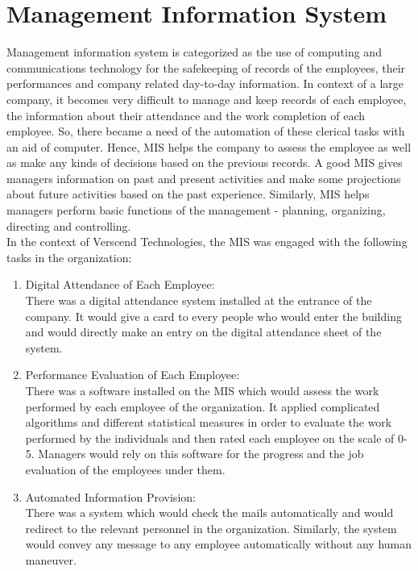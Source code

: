 \section{Management Information System}
Management information system is categorized as the use of computing and communications technology for
the safekeeping of records of the employees, their performances and company related day-to-day information.
In context of a large company, it becomes very difficult to manage and keep records of each employee, the
information about their attendance and the work completion of each employee. So, there became a need of
the automation of these clerical tasks with an aid of computer. Hence, MIS helps the company to assess the
employee as well as make any kinds of decisions based on the previous records. A good MIS gives managers
information on past and present activities and make some projections about future activities based on the past
experience. Similarly, MIS helps managers perform basic functions of the management - planning, organizing,
directing and controlling.\\
In the context of Verscend Technologies, the MIS was engaged with the following tasks in the
organization:
\begin{enumerate}
\item Digital Attendance of Each Employee: \\There was a digital attendance system installed at the entrance of
the company. It would give a card to every people who would enter the building and would directly make
an entry on the digital attendance sheet of the system.
\item Performance Evaluation of Each Employee:\\ There was a software installed on the MIS which would
assess the work performed by each employee of the organization. It applied complicated algorithms and
different statistical measures in order to evaluate the work performed by the individuals and then rated each
employee on the scale of 0-5. Managers would rely on this software for the progress and the job evaluation
of the employees under them.
\item Automated Information Provision:\\ There was a system which would check the mails automatically and
would redirect to the relevant personnel in the organization. Similarly, the system would convey any
message to any employee automatically without any human maneuver.
\end{enumerate}
\cleardoublepage
